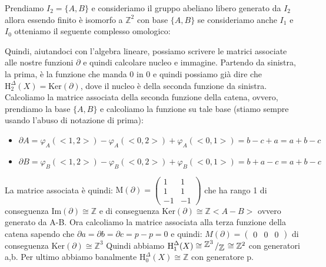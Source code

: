 \documentclass[11pt, a4paper, twoside]{article}
\newcommand{\bigslant}[2]{{\raisebox{.2em}{$#1$}\left/\raisebox{-.2em}{$#2$}\right.}}
\begin{document}
\begin{sol}
	Prendiamo $I_2=\{A,B\}$ e consideriamo il gruppo abeliano libero generato da $I_2$ allora essendo finito è isomorfo a $\mathbb{Z}^2$ con base $\{A,B\}$ se consideriamo anche $I_1$ e $I_0$ otteniamo il seguente complesso omologico:
	\begin{center}
	\end{center}
	Quindi, aiutandoci con l'algebra lineare, possiamo scrivere le matrici associate alle nostre funzioni $\partial$ e quindi calcolare nucleo e immagine. Partendo da sinistra, la prima, è la funzione che manda 0 in 0 e quindi possiamo già dire che $\text{H}_{2}^{\Delta}(X)=\text{Ker}(\partial)$, dove il nucleo è della seconda funzione da sinistra. 
	Calcoliamo la matrice associata della seconda funzione della catena, ovvero, prendiamo la base $\{A,B\}$ e calcoliamo la funzione su tale base (stiamo sempre usando l'abuso di notazione di prima):
	\begin{itemize}
		\item $\partial A=\varphi_A(<1,2>)-\varphi_A(<0,2>)+\varphi_A(<0,1>)=b-c+a=a+b-c$
		\item $\partial B=\varphi_B(<1,2>)-\varphi_B(<0,2>)+\varphi_B(<0,1>)=b+a-c=a+b-c$
	\end{itemize}
	La matrice associata è quindi: $\text{M}(\partial)=\begin{pmatrix} 1&1\\1&1\\-1&-1\end{pmatrix}$ che ha rango 1 di conseguenza Im$(\partial)\cong\mathbb{Z}$ e di conseguenza Ker$(\partial)\cong\mathbb{Z}<A-B>$ ovvero generato da A-B.
	Ora calcoliamo la matrice associata alla terza funzione della catena sapendo che $\partial a =\partial b =\partial c= p-p=0$ e quindi: $M(\partial)=\begin{pmatrix}0&0&0\end{pmatrix}$ di conseguenza Ker$(\partial)\cong\mathbb{Z}^3$
	Quindi abbiamo $\text{H}_{1}^{\Delta}(X)\cong\bigslant{\mathbb{Z}^3}{\mathbb{Z}}\cong{\mathbb{Z}^2}$ con generatori a,b. 
	Per ultimo abbiamo banalmente $\text{H}_{0}^{\Delta}(X)\cong\mathbb{Z}$ con generatore p. 


\end{sol}
\end{document}

